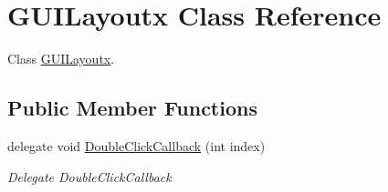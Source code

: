 \hypertarget{class_g_u_i_layoutx}{}\section{G\+U\+I\+Layoutx Class Reference}
\label{class_g_u_i_layoutx}


Class \hyperlink{class_g_u_i_layoutx}{G\+U\+I\+Layoutx}.  


\subsection*{Public Member Functions}
\begin{DoxyCompactItemize}
\item 
delegate void \hyperlink{class_g_u_i_layoutx_ad636807bfe6952505099a4c3be54080d}{Double\+Click\+Callback} (int index)
\begin{DoxyCompactList}\small\item\em Delegate Double\+Click\+Callback \end{DoxyCompactList}\end{DoxyCompactItemize}
